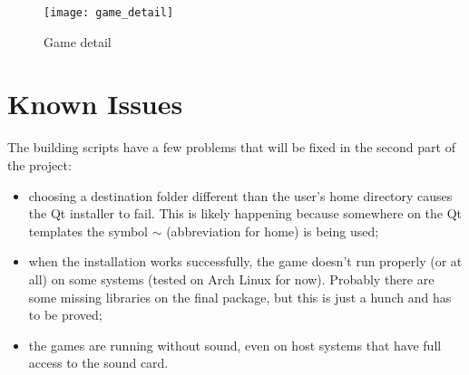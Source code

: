 

\begin{figure}[h!]
\centering
\texttt{[image: game\_detail]}
\caption{Game detail}
\label{fig:game_detail}
\end{figure}

\section{Known Issues}
\label {sec:issues}

The building scripts have a few problems that will be fixed in the second part of the project:

\begin{itemize}
\item choosing a destination folder different than the user's home directory causes the Qt installer to fail. This is likely happening because somewhere on the Qt templates the symbol $\sim$ (abbreviation for home) is being used;

\item when the installation works successfully, the game doesn't run properly (or at all) on some systems (tested on Arch Linux for now). Probably there are some missing libraries on the final package, but this is just a hunch and has to be proved;

\item the games are running without sound, even on host systems that have full access to the sound card.
\end{itemize}
